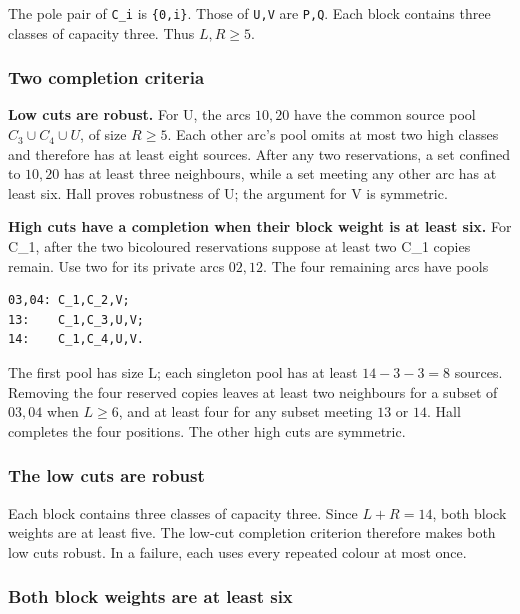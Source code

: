 \documentclass[
  10pt,
]{article}
\begin{document}
The pole pair of \texttt{C\_i} is \texttt{\{0,i\}}. Those of
\texttt{U,V} are \texttt{P,Q}. Each block contains three classes of
capacity three. Thus \(L,R\ge5\).

\hypertarget{two-completion-criteria}{%
\subsubsection*{Two completion criteria}\label{two-completion-criteria}}

\textbf{Low cuts are robust.} For U, the arcs \(10,20\) have the common
source pool \(C_3\cup C_4\cup U\), of size \(R\ge5\). Each other arc's
pool omits at most two high classes and therefore has at least eight
sources. After any two reservations, a set confined to \(10,20\) has at
least three neighbours, while a set meeting any other arc has at least
six. Hall proves robustness of U; the argument for V is symmetric.

\textbf{High cuts have a completion when their block weight is at least
six.} For C\_1, after the two bicoloured reservations suppose at least
two C\_1 copies remain. Use two for its private arcs \(02,12\). The four
remaining arcs have pools

\begin{verbatim}
03,04: C_1,C_2,V;
13:    C_1,C_3,U,V;
14:    C_1,C_4,U,V.
\end{verbatim}

The first pool has size L; each singleton pool has at least \(14-3-3=8\)
sources. Removing the four reserved copies leaves at least two
neighbours for a subset of \(03,04\) when \(L\ge6\), and at least four
for any subset meeting \(13\) or \(14\). Hall completes the four
positions. The other high cuts are symmetric.

\hypertarget{the-low-cuts-are-robust}{%
\subsubsection*{The low cuts are robust}\label{the-low-cuts-are-robust}}

Each block contains three classes of capacity three. Since \(L+R=14\),
both block weights are at least five. The low-cut completion criterion
therefore makes both low cuts robust. In a failure, each uses every
repeated colour at most once.

\hypertarget{both-block-weights-are-at-least-six}{%
\subsubsection*{Both block weights are at least
six}\label{both-block-weights-are-at-least-six}}
\end{document}

